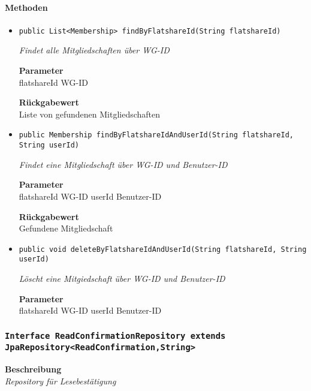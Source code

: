     \paragraph*{Methoden}
    \begin{itemize}
    	\item{\texttt{public List<Membership> findByFlatshareId(String flatshareId)}}
    	
    	\textit{Findet alle Mitgliedschaften über WG-ID}
    	
    	\textbf{Parameter} \\
    	flatshareId WG-ID
    	
    	\textbf{Rückgabewert} \\
    	Liste von gefundenen Mitgliedschaften        \item{\texttt{public Membership findByFlatshareIdAndUserId(String flatshareId, String userId)}}
    	
    	\textit{Findet eine Mitgliedschaft über WG-ID und Benutzer-ID}
    	
    	\textbf{Parameter} \\
    	flatshareId WG-ID
    	userId Benutzer-ID
    	
    	\textbf{Rückgabewert} \\
    	Gefundene Mitgliedschaft        \item{\texttt{public void deleteByFlatshareIdAndUserId(String flatshareId, String userId)}}
    	
    	\textit{Löscht eine Mitgiedschaft über WG-ID und Benutzer-ID}
    	
    	\textbf{Parameter} \\
    	flatshareId WG-ID
    	userId Benutzer-ID
    	
    	
    \end{itemize}
    \subsubsection{\texttt{Interface ReadConfirmationRepository extends JpaRepository<ReadConfirmation,String>}}
    \textbf{Beschreibung} \\
    \textit{Repository für Lesebestätigung}
